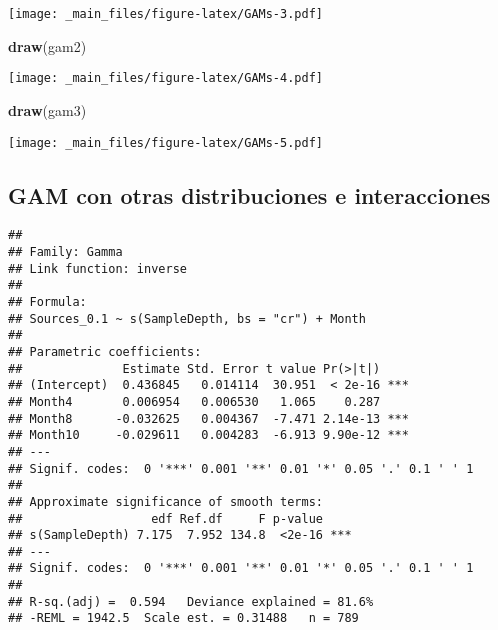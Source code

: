 \documentclass[
]{book}
\newenvironment{Shaded}{\begin{snugshade}}{\end{snugshade}}
\newcommand{\CommentTok}[1]{\textcolor[rgb]{0.56,0.35,0.01}{\textit{#1}}}
\newcommand{\DataTypeTok}[1]{\textcolor[rgb]{0.13,0.29,0.53}{#1}}
\newcommand{\FloatTok}[1]{\textcolor[rgb]{0.00,0.00,0.81}{#1}}
\newcommand{\KeywordTok}[1]{\textcolor[rgb]{0.13,0.29,0.53}{\textbf{#1}}}
\newcommand{\NormalTok}[1]{#1}
\newcommand{\OperatorTok}[1]{\textcolor[rgb]{0.81,0.36,0.00}{\textbf{#1}}}
\newcommand{\StringTok}[1]{\textcolor[rgb]{0.31,0.60,0.02}{#1}}
\begin{document}
\texttt{[image: \_main\_files/figure-latex/GAMs-3.pdf]}

\begin{Shaded}
\begin{Highlighting}[]
\KeywordTok{draw}\NormalTok{(gam2)}
\end{Highlighting}
\end{Shaded}

\texttt{[image: \_main\_files/figure-latex/GAMs-4.pdf]}

\begin{Shaded}
\begin{Highlighting}[]
\KeywordTok{draw}\NormalTok{(gam3)}
\end{Highlighting}
\end{Shaded}

\texttt{[image: \_main\_files/figure-latex/GAMs-5.pdf]}

\hypertarget{gam-con-otras-distribuciones-e-interacciones}{%
\subsection{GAM con otras distribuciones e interacciones}\label{gam-con-otras-distribuciones-e-interacciones}}

\begin{Shaded}
\end{Shaded}

\begin{verbatim}
## 
## Family: Gamma 
## Link function: inverse 
## 
## Formula:
## Sources_0.1 ~ s(SampleDepth, bs = "cr") + Month
## 
## Parametric coefficients:
##              Estimate Std. Error t value Pr(>|t|)    
## (Intercept)  0.436845   0.014114  30.951  < 2e-16 ***
## Month4       0.006954   0.006530   1.065    0.287    
## Month8      -0.032625   0.004367  -7.471 2.14e-13 ***
## Month10     -0.029611   0.004283  -6.913 9.90e-12 ***
## ---
## Signif. codes:  0 '***' 0.001 '**' 0.01 '*' 0.05 '.' 0.1 ' ' 1
## 
## Approximate significance of smooth terms:
##                  edf Ref.df     F p-value    
## s(SampleDepth) 7.175  7.952 134.8  <2e-16 ***
## ---
## Signif. codes:  0 '***' 0.001 '**' 0.01 '*' 0.05 '.' 0.1 ' ' 1
## 
## R-sq.(adj) =  0.594   Deviance explained = 81.6%
## -REML = 1942.5  Scale est. = 0.31488   n = 789
\end{verbatim}
\end{document}

